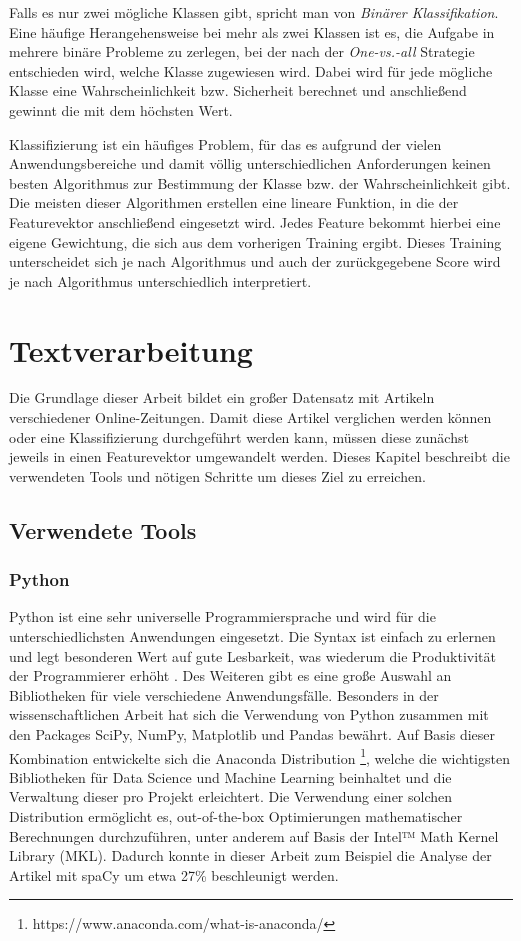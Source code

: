 Falls es nur zwei mögliche Klassen gibt, spricht man von \emph{Binärer Klassifikation}. Eine häufige Herangehensweise bei mehr als zwei Klassen ist es, die Aufgabe in mehrere binäre Probleme zu zerlegen, bei der nach der \emph{One-vs.-all} Strategie entschieden wird, welche Klasse zugewiesen wird. Dabei wird für jede mögliche Klasse eine Wahrscheinlichkeit bzw. Sicherheit berechnet und anschließend gewinnt die mit dem höchsten Wert.

Klassifizierung ist ein häufiges Problem, für das es aufgrund der vielen Anwendungsbereiche und damit völlig unterschiedlichen Anforderungen keinen besten Algorithmus zur Bestimmung der Klasse bzw. der Wahrscheinlichkeit gibt. Die meisten dieser Algorithmen erstellen eine lineare Funktion, in die der Featurevektor anschließend eingesetzt wird. Jedes Feature bekommt hierbei eine eigene Gewichtung, die sich aus dem vorherigen Training ergibt. Dieses Training unterscheidet sich je nach Algorithmus und auch der zurückgegebene Score wird je nach Algorithmus unterschiedlich interpretiert.

\chapter{Textverarbeitung}
Die Grundlage dieser Arbeit bildet ein großer Datensatz mit Artikeln verschiedener Online-Zeitungen. Damit diese Artikel verglichen werden können oder eine Klassifizierung durchgeführt werden kann, müssen diese zunächst jeweils in einen Featurevektor umgewandelt werden. Dieses Kapitel beschreibt die verwendeten Tools und nötigen Schritte um dieses Ziel zu erreichen.

\section{Verwendete Tools}

\subsection{Python}\label{python}
Python ist eine sehr universelle Programmiersprache und wird für die unterschiedlichsten Anwendungen eingesetzt. Die Syntax ist einfach zu erlernen und legt besonderen Wert auf gute Lesbarkeit, was wiederum die Produktivität der Programmierer erhöht \cite{pythonSummary}. Des Weiteren gibt es eine große Auswahl an Bibliotheken für viele verschiedene Anwendungsfälle. Besonders in der wissenschaftlichen Arbeit hat sich die Verwendung von Python zusammen mit den Packages SciPy, NumPy, Matplotlib und Pandas bewährt. Auf Basis dieser Kombination entwickelte sich die Anaconda Distribution \footnote{https://www.anaconda.com/what-is-anaconda/}, welche die wichtigsten Bibliotheken für Data Science und Machine Learning beinhaltet und die Verwaltung dieser pro Projekt erleichtert. Die Verwendung einer solchen Distribution ermöglicht es, out-of-the-box Optimierungen mathematischer Berechnungen durchzuführen, unter anderem auf Basis der Intel™ Math Kernel Library (MKL). Dadurch konnte in dieser Arbeit zum Beispiel die Analyse der Artikel mit spaCy um etwa 27\% beschleunigt werden.

